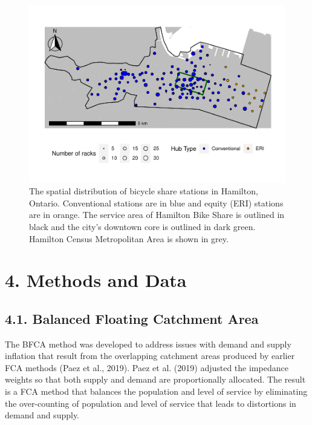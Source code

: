\documentclass[]{elsarticle} %
\begin{document}
\begin{figure}

{\centering \includegraphics[width=1\linewidth]{Bike-share-spatial-equity_files/figure-latex/sobi-stations-in-hamilton-1} 

}

\caption{The spatial distribution of bicycle share stations in Hamilton, Ontario. Conventional stations are in blue and equity (ERI) stations are in orange. The service area of Hamilton Bike Share is outlined in black and the city's downtown core is outlined in dark green. Hamilton Census Metropolitan Area is shown in grey.}\label{fig:sobi-stations-in-hamilton}
\end{figure}

\hypertarget{sec:methods}{%
\section{4. Methods and Data}\label{sec:methods}}

\hypertarget{balanced-floating-catchment-area}{%
\subsection{4.1. Balanced Floating Catchment
Area}\label{balanced-floating-catchment-area}}

The BFCA method was developed to address issues with demand and supply
inflation that result from the overlapping catchment areas produced by
earlier FCA methods (Paez et al., 2019). Paez et al. (2019) adjusted the
impedance weights so that both supply and demand are proportionally
allocated. The result is a FCA method that balances the population and
level of service by eliminating the over-counting of population and
level of service that leads to distortions in demand and supply.
\end{document}
